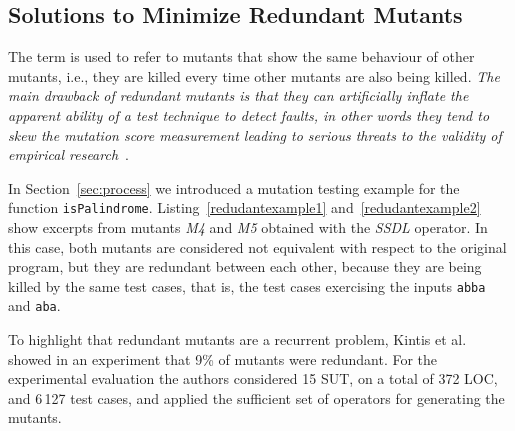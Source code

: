 
\subsection{Solutions to Minimize Redundant Mutants}
\label{sec:opt:redundant}

The term  is used to refer to mutants that show the same behaviour of other mutants, i.e., they
are killed every time other mutants are also being killed. 
\emph{The main drawback of redundant mutants is that they can artificially inflate the apparent ability of a test technique to detect faults, in other words they tend to skew the mutation score measurement leading to serious threats to the validity of empirical research}~\cite{papadakis2016threats}.




In Section~\ref{sec:process} we introduced a mutation testing example for the function \texttt{isPalindrome}. 
Listing~\ref{redudantexample1} and~\ref{redudantexample2} show excerpts from mutants \textit{M4} and \textit{M5} obtained with the \textit{SSDL} operator. In this case, both mutants are considered not equivalent with respect to the original program, but they are redundant between each other, because they are being killed by the same test cases, that is, the test cases exercising the inputs \texttt{abba} and \texttt{aba}.


To highlight that redundant mutants are a recurrent problem, Kintis et al.~\cite{kintis2010evaluating} showed in an experiment that 9\% of mutants were redundant. For the experimental evaluation the authors considered 15 SUT, on a total of 372 LOC, and 6\,127 test cases, and applied the sufficient set of operators for generating the mutants. 

